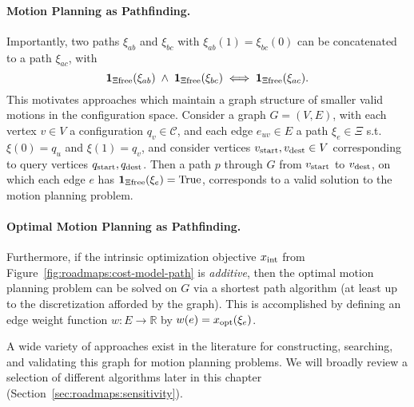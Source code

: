 \paragraph{Motion Planning as Pathfinding.}
Importantly,
two paths $\xi_{ab}$ and $\xi_{bc}$ with $\xi_{ab}(1) = \xi_{bc}(0)$
can be concatenated to a path $\xi_{ac}$,
with
\begin{equation}
   \mathbf{1}_{\Xi\mbox{\scriptsize free}}(\xi_{ab})
   \;\land\;
   \mathbf{1}_{\Xi\mbox{\scriptsize free}}(\xi_{bc})
   \iff
   \mathbf{1}_{\Xi\mbox{\scriptsize free}}(\xi_{ac}).
\end{equation}
This motivates approaches which maintain a graph structure of
smaller valid motions in the configuration space.
Consider a graph $G = (V,E)$,
with each vertex $v \in V$ a configuration $q_v \in \mathcal{C}$,
and each edge $e_{uv} \in E$ a path $\xi_e \in \Xi$
s.t. $\xi(0) = q_u$ and $\xi(1) = q_v$,
and consider vertices $v_{\mbox{\scriptsize start}}, v_{\mbox{\scriptsize dest}} \in V$
corresponding to query vertices $q_{\mbox{\scriptsize start}}, q_{\mbox{\scriptsize dest}}$.
Then a path $p$ through $G$ from
$v_{\mbox{\scriptsize start}}$ to $v_{\mbox{\scriptsize dest}}$,
on which each edge $e$ has $\mathbf{1}_{\Xi\mbox{\scriptsize free}}(\xi_e) = \mbox{True}$,
corresponds to a valid solution to the motion planning problem.

\paragraph{Optimal Motion Planning as Pathfinding.}
Furthermore,
if the intrinsic optimization objective $x_{\mbox{\scriptsize int}}$
from Figure~\ref{fig:roadmaps:cost-model-path} is \emph{additive},
then the optimal motion planning problem can be solved on $G$
via a shortest path algorithm
(at least up to the discretization afforded by the graph).
This is accomplished by defining an edge weight function
$w : E \rightarrow \mathbb{R}$
by $w(e) = x_{\mbox{\scriptsize opt}}(\xi_e)$.

A wide variety of approaches exist in the literature for
constructing, searching, and validating this graph
for motion planning problems.
We will broadly review a selection of different algorithms later
in this chapter (Section~\ref{sec:roadmaps:sensitivity}).



